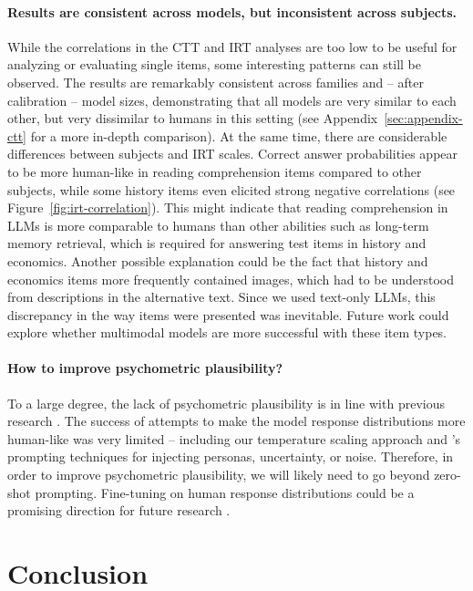 \documentclass[11pt]{article}
\begin{document}
\paragraph{Results are consistent across models, but inconsistent across subjects.}

While the correlations in the CTT and IRT analyses are too low to be useful for analyzing or evaluating single items, some interesting patterns can still be observed. The results are remarkably consistent across families and -- after calibration -- model sizes, demonstrating that all models are very similar to each other, but very dissimilar to humans in this setting (see Appendix~\ref{sec:appendix-ctt} for a more in-depth comparison). At the same time, there are considerable differences between subjects and IRT scales. Correct answer probabilities appear to be more human-like in reading comprehension items compared to other subjects, while some history items even elicited strong negative correlations (see Figure~\ref{fig:irt-correlation}). This might indicate that reading comprehension in LLMs is more comparable to humans than other abilities such as long-term memory retrieval, which is required for answering test items in history and economics. Another possible explanation could be the fact that history and economics items more frequently contained images, which had to be understood from descriptions in the alternative text. Since we used text-only LLMs, this discrepancy in the way items were presented was inevitable. Future work could explore whether multimodal models are more successful with these item types.

\paragraph{How to improve psychometric plausibility?}

To a large degree, the lack of psychometric plausibility is in line with previous research \citep{Hayakawa2024,Zotos2025}. The success of attempts to make the model response distributions more human-like was very limited -- including our temperature scaling approach and \citeauthor{Hayakawa2024}'s \citeyearpar{Hayakawa2024} prompting techniques for injecting personas, uncertainty, or noise. Therefore, in order to improve psychometric plausibility, we will likely need to go beyond zero-shot prompting. Fine-tuning on human response distributions could be a promising direction for future research \citep[cf.][]{Chen2024}.


\section{Conclusion}
\end{document}
